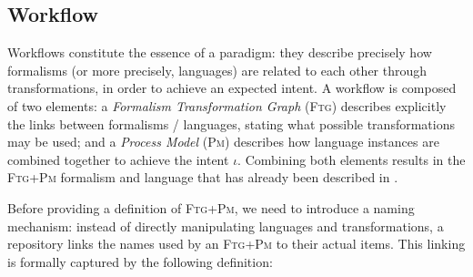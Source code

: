 
\subsection{Workflow}
\label{sec:Workflow}

Workflows constitute the essence of a paradigm: they describe precisely how 
formalisms (or more precisely, languages) are related to each other through 
transformations, in order to achieve an expected intent. 
A workflow is composed of two elements: a \emph{Formalism Transformation Graph} 
(\textsc{Ftg}) describes explicitly the links between formalisms / languages, 
stating what possible transformations may be used; and a \emph{Process Model} 
(\textsc{Pm}) describes how language instances are 
combined together to achieve the intent $\iota$. Combining both elements 
results in the \textsc{Ftg+Pm} formalism and language that has already been 
described in 
\cite{Mustafiz-etAl:2012,Lucio-Mustafiz-etAl:2013,TR:Lucio-Mustafiz-etAl:2012}.

Before providing a definition of \textsc{Ftg+Pm}, we need to introduce a naming 
mechanism: instead of directly manipulating languages and transformations, a 
repository links the names used by an \textsc{Ftg+Pm} to their actual items. 
This linking is formally captured by the following definition:



